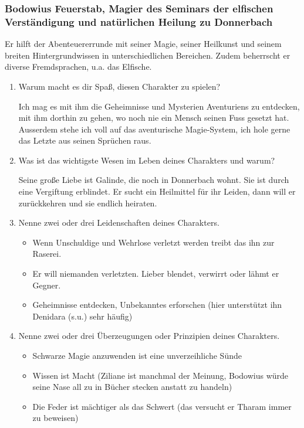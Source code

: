 \subsubsection{Bodowius Feuerstab, 
Magier des Seminars der elfischen Verständigung und natürlichen Heilung zu Donnerbach}
Er hilft der Abenteuererrunde mit seiner Magie, seiner Heilkunst und seinem breiten Hintergrundwissen in unterschiedlichen Bereichen. Zudem beherrscht er diverse Fremdsprachen, u.a. das Elfische.

\begin{enumerate}
  \item Warum macht es dir Spaß, diesen Charakter zu spielen? 

Ich mag es mit ihm die Geheimnisse und Mysterien Aventuriens zu entdecken, mit ihm dorthin zu gehen, wo noch nie ein Mensch seinen Fuss gesetzt hat. Ausserdem stehe ich voll auf das aventurische Magie-System, ich hole gerne das Letzte aus seinen Sprüchen raus.

  \item Was ist das wichtigste Wesen im Leben deines Charakters und warum? 

Seine große Liebe ist Galinde, die noch in Donnerbach wohnt. Sie ist durch eine Vergiftung erblindet. Er sucht ein Heilmittel für ihr Leiden, dann will er zurückkehren und sie endlich heiraten.

  \item Nenne zwei oder drei Leidenschaften deines Charakters. 

  \begin{itemize}
    \item Wenn Unschuldige und Wehrlose verletzt werden treibt das ihn zur Raserei.
    \item Er will niemanden verletzten. Lieber blendet, verwirrt oder lähmt er Gegner.
    \item Geheimnisse entdecken, Unbekanntes erforschen (hier unterstützt ihn Denidara (s.u.) sehr häufig)
  \end{itemize}

  \item Nenne zwei oder drei Überzeugungen oder Prinzipien deines Charakters.

  \begin{itemize}
    \item Schwarze Magie anzuwenden ist eine unverzeihliche Sünde 
    \item Wissen ist Macht (Ziliane ist manchmal der Meinung, Bodowius würde seine Nase all zu in Bücher stecken anstatt zu handeln)
    \item Die Feder ist mächtiger als das Schwert (das versucht er Tharam immer zu beweisen)
  \end{itemize}

\end{enumerate}

